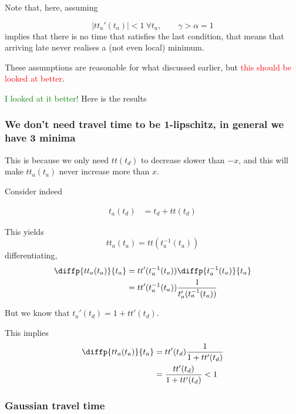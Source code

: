 \documentclass{article}
\begin{document}
Note that, here, assuming

\begin{equation}
  \label{eq:cond_late_min}
|tt_a'(t_a)| < 1 \ \forall t_a, \qquad \gamma > \alpha = 1
\end{equation}
implies that there is no time that satisfies the last condition, that means that arriving late never realises a (not even local) minimum.

These assumptions are reasonable for what discussed earlier, but \textcolor{red}{this should be looked at better}.

\textcolor{green}{I looked at it better!} Here is the results

\subsubsection{We don't need travel time to be 1-lipschitz, in general we have 3 minima}

This is because we only need \(tt(t_d)\) to decrease slower than \(-x\), and this will make \(tt_a(t_a)\) never increase more than \(x\).

Consider indeed

\begin{align*}
  t_a(t_d) & = t_d + tt(t_d)
\end{align*}

This yields
\begin{equation*}
  tt_a(t_a) = tt(t_a^{-1}(t_a))
\end{equation*}
differentiating,
\begin{align*}
  \diffp{tt_a(t_a)}{{t_a}} & = tt'(t_a^{-1}(t_a)) \diffp{t_a^{-1}(t_a)}{{t_a}} \\
  & = tt'(t_a^{-1}(t_a)) \frac{1}{t_a'(t_a^{-1}(t_a))}
\end{align*}

But we know that \(t_a'(t_d) = 1 + tt'(t_d)\).

This implies
\begin{align*}
  \diffp{tt_a(t_a)}{{t_a}} & = tt'(t_d) \frac{1}{1+tt'(t_d)} \\
  & = \frac{tt'(t_d)}{1+tt'(t_d)} < 1
\end{align*}

\subsubsection{Gaussian travel time}
\end{document}
